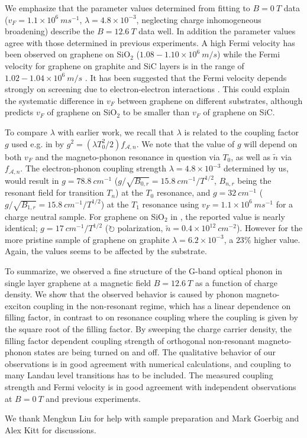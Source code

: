 \documentclass[prl,aps,superscriptaddress,showpacs,reprint]{revtex4-1}
\begin{document}
We emphasize that the parameter values determined from fitting to $B=0\: T$ data ($v_F=1.1\times 10^6\: ms^{-1}$, $\lambda=4.8\times 10^{-3}$, neglecting charge inhomogeneous broadening) describe the $B=12.6\: T$ data well. In addition the parameter values agree with those determined in previous experiments. A high Fermi velocity has been observed on graphene on SiO$_2$ ($1.08-1.10\times 10^6\: m/s$) \cite{PhysRevLett.110.227402,kossacki2012circular} while the Fermi velocity for graphene on graphite and SiC layers is in the range  of $1.02-1.04\times 10^6\: m/s$ \cite{faugeras2009tuning,kuhne2012polarization}. It has been suggested that the Fermi velocity depends strongly on screening due to electron-electron interactions \cite{hwang2012fermi}. This could explain the systematic difference in $v_F$ between graphene on different substrates, although \cite{hwang2012fermi} predicts $v_F$ of graphene on SiO$_2$ to be smaller than $v_F$ of graphene on SiC.

To compare $\lambda$ with earlier work, we recall that $\lambda$ is related to the coupling factor $g$ used e.g. in \cite{yan2010observation,PhysRevLett.110.227402} by $g^2=(\lambda T_0^2/2) f_{\mathcal{A},n}$.  We note that  the value of $g$ will depend on both $v_F$ and the magneto-phonon resonance in question via $T_0$, as well as $\widetilde{n}$ via $f_{\mathcal{A},n}$.
The electron-phonon coupling strength $\lambda=4.8\times 10^{-3}$ determined by us,
would result in $g=78.8\: cm^{-1}$  ($ g/\sqrt{B_{0,r}}=15.8 \:  cm^{-1}/T^{1/2}$, $B_{n,r}$ being the resonant field for transition $T_n$) at the $T_0$ resonance, and  $ g=32\: cm^{-1}$ ($ g/\sqrt{B_{1,r}}=15.8\: cm^{-1}/T^{1/2}$) at the $T_1$ resonance using $v_F=1.1\times 10^6\: ms^{-1}$ for a charge neutral sample. For graphene on SiO$_2$  in \cite{PhysRevLett.110.227402}, the reported value is nearly identical;  $ g=17\: cm^{-1}/T^{1/2}$ ($\circlearrowright$ polarization, $\widetilde{n}=0.4\times 10^{12}\: cm^{-2}$).    However for the more pristine sample of  graphene on graphite \cite{yan2010observation} $\lambda= 6.2 \times 10^{-3}$, a $23\%$ higher value. Again, the values seems to be affected by the substrate.

To summarize,  we observed a fine structure of the G-band optical phonon in single layer graphene at a magnetic field $B=12.6\: T$ as a function of charge density. We show that the observed behavior is caused by phonon magneto-exciton coupling in the non-resonant regime, which has a linear dependence on filling factor, in contrast to on resonance coupling where the coupling is given by the square root of the filling factor.  By sweeping the charge carrier density, the filling factor dependent coupling strength of orthogonal non-resonant  magneto-phonon states are being turned on and off.  The qualitative behavior of our observations is in good agreement with numerical calculations, and coupling to many Landau level transitions has to be included. The measured  coupling strength and Fermi velocity is in good agreement with independent observations at $B=0\: T$ and previous experiments.
\\

\begin{acknowledgments}
We thank Mengkun Liu for help with sample preparation and Mark Goerbig and Alex Kitt for discussions.
\end{acknowledgments}




\end{document}
